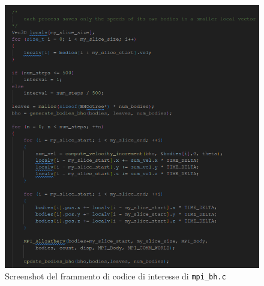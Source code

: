 \documentclass[12pt]{report}
\begin{document}
    \begin{figure}[H]
        \centering
        \includegraphics[width=\textwidth]{images/mpi_bh.png}
        \caption{Screenshot del frammento di codice di interesse di \texttt{mpi\_bh.c}}
        \label{fig:mpi_bh}
    \end{figure}
\end{document}
